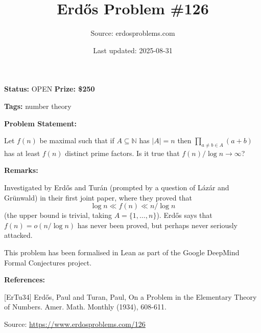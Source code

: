 \documentclass{article}
\title{Erd\H{o}s Problem \#126}
\date{Last updated: 2025-08-31}
\author{Source: erdosproblems.com}
\begin{document}
\maketitle

\noindent\textbf{Status:} OPEN \quad \textbf{Prize: \$250}

\noindent\textbf{Tags:} number theory

\medskip
\noindent\textbf{Problem Statement:}

Let $f(n)$ be maximal such that if $A\subseteq\mathbb{N}$ has $\lvert A\rvert=n$ then $\prod_{a\neq b\in A}(a+b)$ has at least $f(n)$ distinct prime factors. Is it true that $f(n)/\log n\to\infty$?

\bigskip
\noindent\textbf{Remarks:}

Investigated by Erd\H{o}s and Tur\'{a}n \cite{ErTu34} (prompted by a question of L\'{a}z\'{a}r and Gr\"{u}nwald) in their first joint paper, where they proved that\[\log n \ll f(n) \ll n/\log n\](the upper bound is trivial, taking $A=\{1,\ldots,n\}$). Erd\H{o}s says that $f(n)=o(n/\log n)$ has never been proved, but perhaps never seriously attacked.

This problem has been formalised in Lean as part of the Google DeepMind Formal Conjectures project.

\bigskip
\noindent\textbf{References:}

[ErTu34] Erd\H{o}s, Paul and Turan, Paul, On a Problem in the Elementary Theory of Numbers. Amer. Math. Monthly (1934), 608-611.

\bigskip
\noindent\small{Source: \url{https://www.erdosproblems.com/126}}
\end{document}
